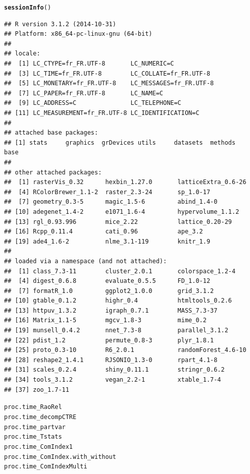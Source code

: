 \documentclass[12pt]{article}\usepackage[]{graphicx}\usepackage[]{color}
\makeatletter
\newcommand{\hlstd}[1]{\textcolor[rgb]{0.345,0.345,0.345}{#1}}%
\newcommand{\hlkwd}[1]{\textcolor[rgb]{0.737,0.353,0.396}{\textbf{#1}}}%
\newenvironment{kframe}{%
 \def\at@end@of@kframe{}%
 \ifinner\ifhmode%
  \def\at@end@of@kframe{\end{minipage}}%
  \begin{minipage}{\columnwidth}%
 \fi\fi%
 \def\FrameCommand##1{\hskip\@totalleftmargin \hskip-\fboxsep
 \colorbox{shadecolor}{##1}\hskip-\fboxsep
     \hskip-\linewidth \hskip-\@totalleftmargin \hskip\columnwidth}%
 \MakeFramed {\advance\hsize-\width
   \@totalleftmargin\z@ \linewidth\hsize
   \@setminipage}}%
 {\par\unskip\endMakeFramed%
 \at@end@of@kframe}
\newenvironment{knitrout}{}{} %
\makeatother
\begin{document}
\begin{knitrout}
\color{fgcolor}\begin{kframe}
\begin{alltt}
\hlkwd{sessionInfo}\hlstd{()}
\end{alltt}
\begin{verbatim}
## R version 3.1.2 (2014-10-31)
## Platform: x86_64-pc-linux-gnu (64-bit)
## 
## locale:
##  [1] LC_CTYPE=fr_FR.UTF-8       LC_NUMERIC=C              
##  [3] LC_TIME=fr_FR.UTF-8        LC_COLLATE=fr_FR.UTF-8    
##  [5] LC_MONETARY=fr_FR.UTF-8    LC_MESSAGES=fr_FR.UTF-8   
##  [7] LC_PAPER=fr_FR.UTF-8       LC_NAME=C                 
##  [9] LC_ADDRESS=C               LC_TELEPHONE=C            
## [11] LC_MEASUREMENT=fr_FR.UTF-8 LC_IDENTIFICATION=C       
## 
## attached base packages:
## [1] stats     graphics  grDevices utils     datasets  methods   base     
## 
## other attached packages:
##  [1] rasterVis_0.32      hexbin_1.27.0       latticeExtra_0.6-26
##  [4] RColorBrewer_1.1-2  raster_2.3-24       sp_1.0-17          
##  [7] geometry_0.3-5      magic_1.5-6         abind_1.4-0        
## [10] adegenet_1.4-2      e1071_1.6-4         hypervolume_1.1.2  
## [13] rgl_0.93.996        mice_2.22           lattice_0.20-29    
## [16] Rcpp_0.11.4         cati_0.96           ape_3.2            
## [19] ade4_1.6-2          nlme_3.1-119        knitr_1.9          
## 
## loaded via a namespace (and not attached):
##  [1] class_7.3-11        cluster_2.0.1       colorspace_1.2-4   
##  [4] digest_0.6.8        evaluate_0.5.5      FD_1.0-12          
##  [7] formatR_1.0         ggplot2_1.0.0       grid_3.1.2         
## [10] gtable_0.1.2        highr_0.4           htmltools_0.2.6    
## [13] httpuv_1.3.2        igraph_0.7.1        MASS_7.3-37        
## [16] Matrix_1.1-5        mgcv_1.8-3          mime_0.2           
## [19] munsell_0.4.2       nnet_7.3-8          parallel_3.1.2     
## [22] pdist_1.2           permute_0.8-3       plyr_1.8.1         
## [25] proto_0.3-10        R6_2.0.1            randomForest_4.6-10
## [28] reshape2_1.4.1      RJSONIO_1.3-0       rpart_4.1-8        
## [31] scales_0.2.4        shiny_0.11.1        stringr_0.6.2      
## [34] tools_3.1.2         vegan_2.2-1         xtable_1.7-4       
## [37] zoo_1.7-11
\end{verbatim}
\end{kframe}
\end{knitrout}

\begin{knitrout}
\color{fgcolor}\begin{kframe}
\begin{alltt}
\hlstd{proc.time_RaoRel}
\hlstd{proc.time_decompCTRE}
\hlstd{proc.time_partvar}
\hlstd{proc.time_Tstats}
\hlstd{proc.time_ComIndex1}
\hlstd{proc.time_ComIndex.with_without}
\hlstd{proc.time_ComIndexMulti}
\end{alltt}
\end{kframe}
\end{knitrout}
\end{document}
